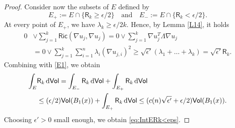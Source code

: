 \documentclass[10pt]{article}
\theoremstyle{definition}
\newcommand{\ssf}[1]{\mathsf{#1}}
\newcommand{\Ric}{\mathsf{Ric}}
\newcommand{\R}{\mathsf{R}}
\newcommand{\de}{{\rm d}}
\begin{document}
\begin{proof}
            Consider now the subsets of $E$ defined by
            \[
            E_+:=E \cap \{\R_k \geq \epsilon/2\} \quad \text{and} \quad 
            E_-:=E \cap \{\R_k < \epsilon/2\}.
            \]
            At every point of $E_+$, we have $\lambda_k \geq \epsilon/2k$. Hence, by Lemma \ref{L14}, it holds
            \begin{align*}
            0 & \vee \sum_{j=1}^k \Ric(\nabla u_j,\nabla u_j)=0 \vee \sum_{j=1 }^k \nabla u_j^T \Lambda \nabla u_j
            \\ 
            & = 0 \vee \sum_{j=1}^k \sum_{i=1}^n \lambda_i (\nabla u_{j,i})^2 \geq \sqrt{\epsilon'} (\lambda_1 + \dots + \lambda_k) =\sqrt{\epsilon'} \R_k.
            \end{align*}
            Combining with \eqref{E1}, we obtain
            \begin{align} 
            \label{E2}
            \nonumber 
            \int_{E} & \R_k \,\de\ssf{Vol} = 
            \int_{E_-} \R_k \,\de\ssf{Vol}+
            \int_{E_+} \R_k \,\de\ssf{Vol} 
            \\ 
            & \leq 
            (\epsilon/2) \ssf{Vol}(B_1(x))+\int_{E_+} \R_k \,\de\ssf{Vol} 
            \leq (c(n)\sqrt{\epsilon'}+\epsilon/2) \ssf{Vol}(B_1(x)).
            \end{align}
            Choosing $\epsilon'>0$ small enough, we obtain \eqref{eq:IntERk<eps}.
            

\end{proof}
\end{document}

